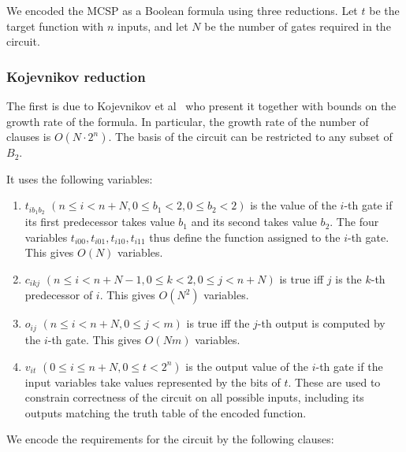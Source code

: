 \documentclass{article}
\begin{document}
We encoded the MCSP as a Boolean formula using three reductions. Let $t$ be the target function with $n$ inputs, and let $N$ be the number of gates required in the circuit.

\subsubsection{Kojevnikov reduction}

The first is due to Kojevnikov et al~\cite{kulikov} who present it together with bounds on the growth rate of the formula. In particular, the growth rate of the number of clauses is $O(N \cdot 2^n)$. The basis of the circuit can be restricted to any subset of \(B_2\).

It uses the following variables:

\begin{enumerate}

  \item $t_{ib_1b_2}$ $(n \leq i < n + N, 0 \leq b_1 < 2, 0 \leq b_2 < 2)$ is the value of the $i$-th gate if its first predecessor takes value $b_1$ and its second takes value $b_2$. The four variables $t_{i00}, t_{i01}, t_{i10}, t_{i11}$ thus define the function assigned to the $i$-th gate. This gives $O(N)$ variables.
  \item $c_{ikj}$ $(n \leq i < n + N - 1, 0 \leq k < 2, 0 \leq j < n + N)$ is true iff $j$ is the $k$-th predecessor of $i$. This gives $O(N^2)$ variables.
  \item $o_{ij}$ $(n \leq i < n + N, 0 \leq j < m)$ is true iff the $j$-th output is computed by the $i$-th gate. This gives $O(Nm)$ variables.
  \item $v_{it}$ $(0 \leq i \leq n + N, 0 \leq t < 2^n)$ is the output value of the $i$-th gate if the input variables take values represented by the bits of $t$. These are used to constrain correctness of the circuit on all possible inputs, including its outputs matching the truth table of the encoded function.

\end{enumerate}

We encode the requirements for the circuit by the following clauses:
\end{document}
